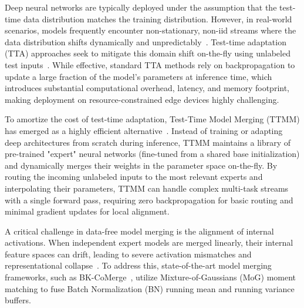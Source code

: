 \documentclass{article}
\theoremstyle{plain}
\theoremstyle{definition}
\theoremstyle{remark}
\begin{document}
Deep neural networks are typically deployed under the assumption that the test-time data distribution matches the training distribution. However, in real-world scenarios, models frequently encounter non-stationary, non-iid streams where the data distribution shifts dynamically and unpredictably~\cite{schneider2020improving}. Test-time adaptation (TTA) approaches seek to mitigate this domain shift on-the-fly using unlabeled test inputs~\cite{wang2020tent,liang2020shot}. While effective, standard TTA methods rely on backpropagation to update a large fraction of the model's parameters at inference time, which introduces substantial computational overhead, latency, and memory footprint, making deployment on resource-constrained edge devices highly challenging.

To amortize the cost of test-time adaptation, Test-Time Model Merging (TTMM) has emerged as a highly efficient alternative~\cite{hubotter2025local}. Instead of training or adapting deep architectures from scratch during inference, TTMM maintains a library of pre-trained "expert" neural networks (fine-tuned from a shared base initialization) and dynamically merges their weights in the parameter space on-the-fly. By routing the incoming unlabeled inputs to the most relevant experts and interpolating their parameters, TTMM can handle complex multi-task streams with a single forward pass, requiring zero backpropagation for basic routing and minimal gradient updates for local alignment.

A critical challenge in data-free model merging is the alignment of internal activations. When independent expert models are merged linearly, their internal feature spaces can drift, leading to severe activation mismatches and representational collapse~\cite{jordan2022repair}. To address this, state-of-the-art model merging frameworks, such as BK-CoMerge~\cite{anonymous}, utilize Mixture-of-Gaussians (MoG) moment matching to fuse Batch Normalization (BN) running mean and running variance buffers. 
\end{document}
